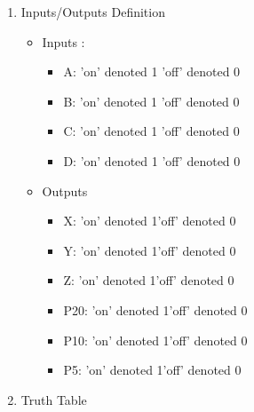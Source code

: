 \begin{enumerate}
\item Inputs/Outputs  Definition
\begin{itemize}
\item Inputs :
\begin{itemize}
\item A: \qquad 'on' denoted 1 \qquad 'off' denoted 0 
\item B: \qquad 'on' denoted 1 \qquad 'off' denoted 0 
\item C: \qquad 'on' denoted 1 \qquad 'off' denoted 0 
\item D: \qquad 'on' denoted 1 \qquad 'off' denoted 0 
\end{itemize}
\item Outputs 
\begin{itemize}
\item X: \qquad 'on' denoted 1\qquad 'off' denoted  0
\item Y: \qquad 'on' denoted 1\qquad 'off' denoted  0
\item Z: \qquad 'on' denoted 1\qquad 'off' denoted  0
\item P20: \qquad 'on' denoted 1\qquad 'off' denoted  0
\item P10: \qquad 'on' denoted 1\qquad 'off' denoted  0
\item P5: \qquad 'on' denoted 1\qquad 'off' denoted  0
\end{itemize}
\end{itemize}
\item Truth Table 

        \begin{tabular}{|c|c|c|c|c||c|c|c|c|c|c|}

    \toprule


\end{tabular}
\end{enumerate}
